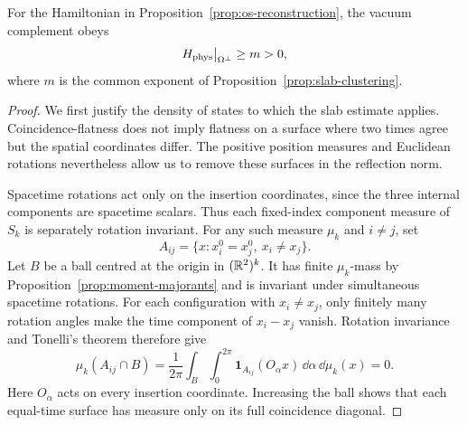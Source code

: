 \begin{proposition}
\label{prop:continuum-gap}
For the Hamiltonian in Proposition~\ref{prop:os-reconstruction}, the
vacuum complement obeys
\begin{equation}
 H_{\rm phys}\big|_{\Omega^\perp}\ge m>0,
 \label{eq:orig-36}
\end{equation}
where $m$ is the common exponent of
Proposition~\ref{prop:slab-clustering}.
\end{proposition}

\begin{proof}
We first justify the density of states to which the slab estimate
applies.  Coincidence-flatness does not imply flatness on a surface
where two times agree but the spatial coordinates differ.  The positive
position measures and Euclidean rotations nevertheless allow us to
remove these surfaces in the reflection norm.

Spacetime rotations act only on the insertion coordinates, since
the three internal components are spacetime scalars.  Thus each
fixed-index component measure of $S_k$ is separately rotation
invariant.  For any such measure $\mu_k$ and $i\ne j$, set
\[
 A_{ij}=\{x:x_i^0=x_j^0,\ x_i\ne x_j\}.
\]
Let $B$ be a ball centred at the origin in $(\mathbb R^2)^k$.  It has finite
$\mu_k$-mass by Proposition~\ref{prop:moment-majorants} and is
invariant under simultaneous spacetime rotations.  For each
configuration with $x_i\ne x_j$, only finitely many rotation angles
make the time component of $x_i-x_j$ vanish.  Rotation invariance and
Tonelli's theorem therefore give
\[
 \mu_k(A_{ij}\cap B)
  =\frac1{2\pi}\int_B\int_0^{2\pi}
       \mathbf 1_{A_{ij}}(O_\alpha x)\,\dd\alpha\,\dd\mu_k(x)=0.
\]
Here $O_\alpha$ acts on every insertion coordinate.  Increasing the
ball shows that each equal-time surface has measure only on its full
coincidence diagonal.


\end{proof}
